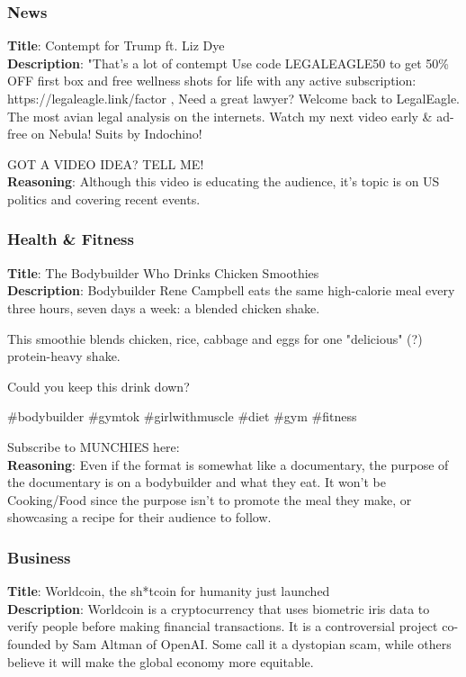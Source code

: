 \documentclass[11pt]{article}
\begin{document}
\subsubsection{News}
\textbf{Title}: Contempt for Trump ft. Liz Dye\\
\textbf{Description}: "That's a lot of contempt Use code LEGALEAGLE50 to get 50\% OFF first box and free wellness shots for life with any active subscription: https://legaleagle.link/factor ‚ Need a great lawyer?
Welcome back to LegalEagle.  The most avian legal analysis on the internets. 
Watch my next video early \& ad-free on Nebula! 
Suits by Indochino! 

GOT A VIDEO IDEA? TELL ME! \\
\textbf{Reasoning}: Although this video is educating the audience, it's topic is on US politics and covering recent events.

\subsubsection{Health \& Fitness}
\textbf{Title}:  The Bodybuilder Who Drinks Chicken Smoothies\\
\textbf{Description}: Bodybuilder Rene Campbell eats the same high-calorie meal every three hours, seven days a week: a blended chicken shake.

This smoothie blends chicken, rice, cabbage and eggs for one "delicious" (?) protein-heavy shake.

Could you keep this drink down?

\#bodybuilder \#gymtok \#girlwithmuscle \#diet \#gym \#fitness 

Subscribe to MUNCHIES here: 
\\
\textbf{Reasoning}: Even if the format is somewhat like a documentary, the purpose of the documentary is on a bodybuilder and what they eat. It won't be Cooking/Food since the purpose isn't to promote the meal they make, or showcasing a recipe for their audience to follow.

\subsubsection{Business}
\textbf{Title}: Worldcoin, the sh*tcoin for humanity just launched \\
\textbf{Description}: Worldcoin is a cryptocurrency that uses biometric iris data to verify people before making financial transactions. It is a controversial project co-founded by Sam Altman of OpenAI. Some call it a dystopian scam, while others believe it will make the global economy more equitable. 
\end{document}

